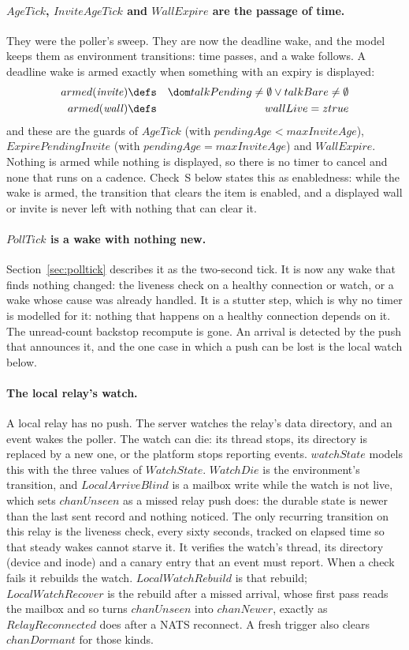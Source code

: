 \documentclass[a4paper,10pt,fleqn]{article}
\begin{document}
\paragraph{$AgeTick$, $InviteAgeTick$ and $WallExpire$ are the passage of
time.}  They were the poller's sweep.  They are now the deadline wake, and the
model keeps them as environment transitions: time passes, and a wake follows.
A deadline wake is armed exactly when something with an expiry is displayed:
\begin{eqnarray*}
  armed(\mathit{invite}) & \defs & \dom talkPending \neq \emptyset \lor
    talkBare \neq \emptyset \\
  armed(\mathit{wall}) & \defs & wallLive = ztrue
\end{eqnarray*}
and these are the guards of $AgeTick$ (with $pendingAge < maxInviteAge$),
$ExpirePendingInvite$ (with $pendingAge = maxInviteAge$) and $WallExpire$.
Nothing is armed while nothing is displayed, so there is no timer to cancel and
none that runs on a cadence.  Check~S below states this as enabledness: while
the wake is armed, the transition that clears the item is enabled, and a
displayed wall or invite is never left with nothing that can clear it.

\paragraph{$PollTick$ is a wake with nothing new.}  Section~\ref{sec:polltick}
describes it as the two-second tick.  It is now any wake that finds nothing
changed: the liveness check on a healthy connection or watch, or a wake whose
cause was already handled.  It is a stutter step, which is why no timer is
modelled for it: nothing that happens on a healthy connection depends on it.
The unread-count backstop recompute is gone.  An arrival is detected by the
push that announces it, and the one case in which a push can be lost is the
local watch below.

\paragraph{The local relay's watch.}  A local relay has no push.  The server
watches the relay's data directory, and an event wakes the poller.  The watch
can die: its thread stops, its directory is replaced by a new one, or the
platform stops reporting events.  $watchState$ models this with the three
values of $WatchState$.  $WatchDie$ is the environment's transition, and
$LocalArriveBlind$ is a mailbox write while the watch is not live, which sets
$chanUnseen$ as a missed relay push does: the durable state is newer than the
last sent record and nothing noticed.  The only recurring transition on this
relay is the liveness check, every sixty seconds, tracked on elapsed time so
that steady wakes cannot starve it.  It verifies the watch's thread, its
directory (device and inode) and a canary entry that an event must report.
When a check fails it rebuilds the watch.  $LocalWatchRebuild$ is that
rebuild; $LocalWatchRecover$ is the rebuild after a missed arrival, whose first
pass reads the mailbox and so turns $chanUnseen$ into $chanNewer$, exactly as
$RelayReconnected$ does after a NATS reconnect.  A fresh trigger also clears
$chanDormant$ for those kinds.
\end{document}
